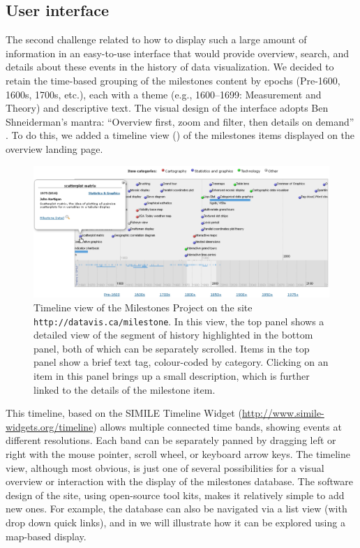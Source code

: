 \subsection{User interface}
The second challenge related to how to display such a large amount of 
information in an easy-to-use interface that would provide overview, search, 
and details about these events in the history of data visualization. 
We decided 
to retain the time-based grouping of the milestones content by epochs 
(Pre-1600, 1600s, 1700s, etc.), each with a theme (e.g., 1600--1699: 
Measurement and Theory) and descriptive text. 
The visual design of the 
interface adopts Ben Shneiderman's mantra: ``Overview first, zoom and filter, 
then details on demand'' \citep{Shneiderman:1996:IEEE}. 
To do this, we added a 
timeline view () of the milestones items 
displayed on the overview landing page. 

\begin{figure}[!htb]
  \centering
  \includegraphics[width=\textwidth,clip]{fig/datavis-timeline2}
  \caption{Timeline view of the Milestones Project on the site 
  \texttt{http://datavis.ca/milestone}. In this view, the top panel shows a 
  detailed view of the segment of history highlighted in the bottom panel, both 
  of which can be separately scrolled. Items in the top panel show a brief text 
  tag, colour-coded by category. Clicking on an item in this panel brings up a 
  small description, which is further linked to the details of the milestone 
  item.
  }
  \label{fig:datavis-timeline2}
\end{figure}

This timeline, based on the SIMILE Timeline Widget 
(\url{http://www.simile-widgets.org/timeline}) allows multiple connected time 
bands, showing events at different resolutions.  
Each band can be separately 
panned by dragging left or right with the mouse pointer, scroll wheel, or 
keyboard arrow keys. 
The timeline view, although most obvious, is just one of 
several possibilities for a visual overview or interaction with the display of 
the milestones database. 
The software design of the site, using open-source 
tool kits, makes it relatively simple to add new ones.  
For example, the 
database can also be navigated via a list view (with drop down quick links), 
and in  we will illustrate how it can be explored using a 
map-based display.

